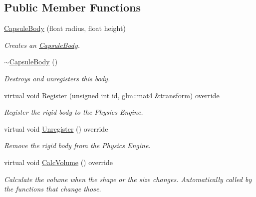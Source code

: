 \subsection*{Public Member Functions}
\begin{DoxyCompactItemize}
\item 
\hyperlink{classTarbora_1_1CapsuleBody_ac7427a8fd201d1eb99944d48619e78ed}{Capsule\+Body} (float radius, float height)
\begin{DoxyCompactList}\small\item\em Creates an \hyperlink{classTarbora_1_1CapsuleBody}{Capsule\+Body}. \end{DoxyCompactList}\item 
\mbox{\label{classTarbora_1_1CapsuleBody_a70eeff3b16e27269076fef05a42a7de8}} 
\hyperlink{classTarbora_1_1CapsuleBody_a70eeff3b16e27269076fef05a42a7de8}{$\sim$\+Capsule\+Body} ()
\begin{DoxyCompactList}\small\item\em Destroys and unregisters this body. \end{DoxyCompactList}\item 
virtual void \hyperlink{classTarbora_1_1CapsuleBody_a1083e8df5302931850b34a9c9ec764e6}{Register} (unsigned int id, glm\+::mat4 \&transform) override
\begin{DoxyCompactList}\small\item\em Register the rigid body to the Physics Engine. \end{DoxyCompactList}\item 
\mbox{\label{classTarbora_1_1CapsuleBody_a9a6b4cf636ab2535ab45976c793112a0}} 
virtual void \hyperlink{classTarbora_1_1CapsuleBody_a9a6b4cf636ab2535ab45976c793112a0}{Unregister} () override
\begin{DoxyCompactList}\small\item\em Remove the rigid body from the Physics Engine. \end{DoxyCompactList}\item 
\mbox{\label{classTarbora_1_1CapsuleBody_a5e296d4aab6f3b5b737a43d9e1937c91}} 
virtual void \hyperlink{classTarbora_1_1CapsuleBody_a5e296d4aab6f3b5b737a43d9e1937c91}{Calc\+Volume} () override
\begin{DoxyCompactList}\small\item\em Calculate the volume when the shape or the size changes. Automatically called by the functions that change those. \end{DoxyCompactList}\item 

\end{DoxyCompactItemize}
